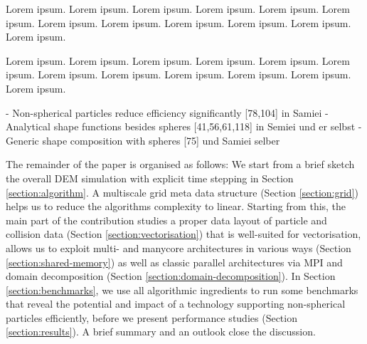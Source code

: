 Lorem ipsum. Lorem ipsum. Lorem ipsum. Lorem ipsum. Lorem ipsum. Lorem ipsum.
Lorem ipsum. Lorem ipsum. Lorem ipsum. Lorem ipsum. Lorem ipsum. Lorem ipsum. 

Lorem ipsum. Lorem ipsum. Lorem ipsum. Lorem ipsum. Lorem ipsum. Lorem ipsum.
Lorem ipsum. Lorem ipsum. Lorem ipsum. Lorem ipsum. Lorem ipsum. Lorem ipsum. 


- Non-spherical particles reduce efficiency significantly [78,104] in Samiei
- Analytical shape functions besides spheres [41,56,61,118] in Semiei und er
selbst
- Generic shape composition with spheres [75] und Samiei selber

The remainder of the paper is organised as follows: 
We start from a brief sketch the overall DEM simulation with
explicit time stepping in Section \ref{section:algorithm}. 
A multiscale grid meta data structure (Section \ref{section:grid}) helps us to
reduce the algorithms complexity to linear.
Starting from this, the main part of the contribution studies a proper data
layout of particle and collision data (Section \ref{section:vectorisation}) that is well-suited for
vectorisation, allows us to exploit multi- and manycore
architectures in various ways (Section \ref{section:shared-memory}) as well as
classic parallel architectures via MPI and domain decomposition (Section
\ref{section:domain-decomposition}).
In Section \ref{section:benchmarks}, we use all algorithmic ingredients to run some benchmarks
that reveal the potential and impact of a technology supporting non-spherical
particles efficiently, before we present performance studies (Section
\ref{section:results}).
A brief summary and an outlook close the discussion.
